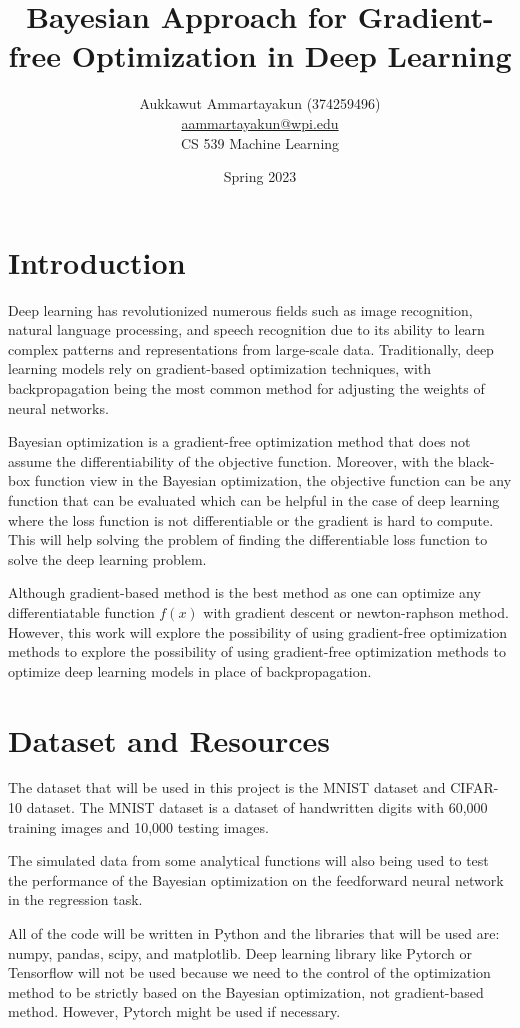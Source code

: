 \documentclass{article}
\title{Bayesian Approach for Gradient-free Optimization in Deep Learning}
\author{Aukkawut Ammartayakun (374259496)\\\href{mailto:aammartayakun@wpi.edu}{aammartayakun@wpi.edu} \\CS 539 Machine Learning}
\date{Spring 2023}
\begin{document}
\maketitle
\section{Introduction}
Deep learning has revolutionized numerous fields such as image recognition, natural language processing, 
and speech recognition due to its ability to learn complex patterns and representations from large-scale data. 
Traditionally, deep learning models rely on gradient-based optimization techniques, with backpropagation being 
the most common method for adjusting the weights of neural networks. 

Bayesian optimization is a gradient-free optimization method that does not assume the differentiability of the objective function. Moreover, with the 
black-box function view in the Bayesian optimization\cite{bo}, the objective function can be any function that can be evaluated which can be helpful in 
the case of deep learning where the loss function is not differentiable or the gradient is hard to compute. This will help solving the problem of finding 
the differentiable loss function to solve the deep learning problem.

Although gradient-based method is the best method as one can optimize any differentiatable function $f(x)$
with gradient descent or newton-raphson method. However, this work will explore the possibility of using gradient-free optimization methods to explore the possibility of 
using gradient-free optimization methods to optimize deep learning models in place of backpropagation.

\section{Dataset and Resources}
The dataset that will be used in this project is the MNIST dataset\cite{mnist} and CIFAR-10\cite{cifar10} dataset. 
The MNIST dataset is a dataset of handwritten digits with 60,000 training images and 10,000 testing images.

The simulated data from some analytical functions will also being used to test the performance of the Bayesian optimization on the feedforward neural network in the regression task.

All of the code will be written in Python and the libraries that will be used are: numpy, pandas, scipy, and matplotlib. Deep learning library like Pytorch or Tensorflow will not be used because we need to the control of the optimization method to be strictly 
based on the Bayesian optimization, not gradient-based method. However, Pytorch might be used if necessary.
\end{document}
